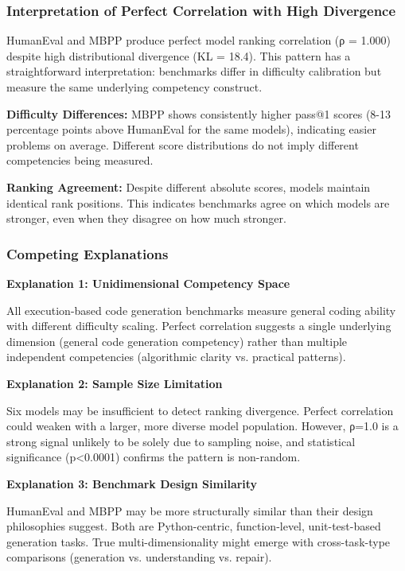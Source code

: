 
\subsubsection{Interpretation of Perfect Correlation with High Divergence}

HumanEval and MBPP produce perfect model ranking correlation (ρ = 1.000) despite high distributional divergence (KL = 18.4). This pattern has a straightforward interpretation: benchmarks differ in difficulty calibration but measure the same underlying competency construct.

\textbf{Difficulty Differences:} MBPP shows consistently higher pass@1 scores (8-13 percentage points above HumanEval for the same models), indicating easier problems on average. Different score distributions do not imply different competencies being measured.

\textbf{Ranking Agreement:} Despite different absolute scores, models maintain identical rank positions. This indicates benchmarks agree on which models are stronger, even when they disagree on how much stronger.

\subsubsection{Competing Explanations}

\textbf{Explanation 1: Unidimensional Competency Space}

All execution-based code generation benchmarks measure general coding ability with different difficulty scaling. Perfect correlation suggests a single underlying dimension (general code generation competency) rather than multiple independent competencies (algorithmic clarity vs. practical patterns).

\textbf{Explanation 2: Sample Size Limitation}

Six models may be insufficient to detect ranking divergence. Perfect correlation could weaken with a larger, more diverse model population. However, ρ=1.0 is a strong signal unlikely to be solely due to sampling noise, and statistical significance (p<0.0001) confirms the pattern is non-random.

\textbf{Explanation 3: Benchmark Design Similarity}

HumanEval and MBPP may be more structurally similar than their design philosophies suggest. Both are Python-centric, function-level, unit-test-based generation tasks. True multi-dimensionality might emerge with cross-task-type comparisons (generation vs. understanding vs. repair).

